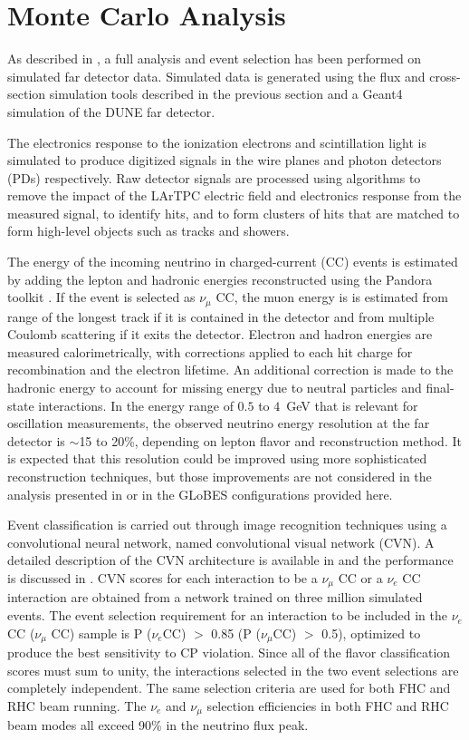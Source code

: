 \documentclass[aps,prd,superscriptaddress]{revtex4-1}
\newcommand{\nue}{\mbox{$\nu_e$}}
\newcommand{\numu}{\mbox{$\nu_{\mu}$}}
\begin{document}
\section{Monte Carlo Analysis}
\label{sect:ana}
As described in \cite{Abi:2020qib}, a full analysis and event selection has been performed on simulated
far detector data.
Simulated data is generated using the flux and cross-section simulation tools described in
the previous section and a Geant4\cite{Agostinelli:2002hh} simulation of the DUNE far detector.

The electronics
response to the ionization
electrons and scintillation light is simulated to produce digitized signals in the wire planes and
photon detectors (PDs) respectively. 
Raw detector signals are processed using algorithms to remove the impact of the LArTPC
electric field and electronics response from the measured signal, to identify hits, and to form clusters of hits
that are matched to form high-level objects such as tracks and showers.

The energy of the incoming neutrino in
charged-current (CC) events is estimated by adding the lepton and hadronic energies reconstructed using the
Pandora toolkit \cite{Marshall:2013bda,Marshall:2012hh}. If the event is selected as $\numu$ CC,
  the muon energy is is estimated from range
of the longest track if it is contained in the detector and from multiple Coulomb scattering if it exits the
detector. Electron and hadron energies are measured calorimetrically, with corrections applied to each hit
charge for recombination and the electron lifetime. An additional correction is made to the hadronic energy to
account for missing energy due to neutral particles and final-state interactions. In the energy range of
$0.5$ to $4$~GeV that is relevant for oscillation measurements, the observed neutrino energy resolution at the far detector
is $\sim$15 to 20\%, depending on lepton flavor and reconstruction method. It is expected that this resolution
could be improved using more sophisticated reconstruction techniques, but those improvements are not
considered in the analysis presented in \cite{Abi:2020qib} or in the GLoBES configurations provided here.

Event classification is carried out through image recognition techniques using a convolutional neural network,
named convolutional visual network (CVN). A detailed description of the CVN architecture is available in
\cite{Abi:2020xvt} and the performance is discussed in \cite{Abi:2020qib}. CVN scores for each interaction
to be a $\numu$ CC or a $\nue$ CC interaction are obtained from a network trained on three million simulated
events. The event selection requirement for an interaction to be included in the $\nue$ CC ($\numu$ CC)
sample is P ($\nue$CC) $>$ 0.85 (P ($\numu$CC) $>$ 0.5), optimized to produce the best sensitivity to CP violation.
Since all of the flavor classification scores must sum to unity, the interactions selected in the two event
selections are completely independent. The same selection criteria are used for both FHC and RHC beam running.
The $\nue$ and $\numu$ selection efficiencies in both FHC and RHC beam modes all exceed 90\% in the neutrino
flux peak.
\end{document}
